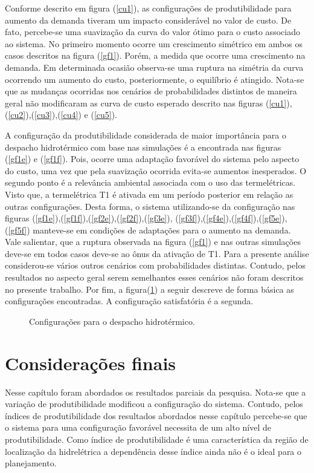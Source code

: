 Conforme descrito em figura (\ref{cu1}), as configura\c c\~oes de produtibilidade para aumento da demanda tiveram um
impacto consider\'avel no valor de custo. De fato, percebe-se uma suaviza\c c\~ao da curva do valor \'otimo para o custo
associado ao sistema. No primeiro momento ocorre um crescimento sim\'etrico em ambos os casos descritos na figura
(\ref{gf1}). Por\'em, a medida que ocorre uma crescimento na demanda. Em determinada ocasi\~ao observa-se uma ruptura na
sim\'etria da curva ocorrendo um aumento do custo, posteriormente, o equil\'ibrio \'e atingido. Nota-se que as mudan\c
cas ocorridas nos cen\'arios de probabilidades distintos de maneira geral n\~ao modificaram as curva de custo esperado
descrito nas figuras (\ref{cu1}),(\ref{cu2}),(\ref{cu3}),(\ref{cu4}) e (\ref{cu5}).

A configura\c c\~ao da
produtibilidade considerada de maior import\^ancia para o despacho hidrot\'ermico com base nas simula\c c\~oes \'e a
encontrada nas figuras
(\ref{gf1e}) e (\ref{gf1f}). Pois, ocorre uma adapta\c c\~ao favor\'avel do sistema pelo
aspecto do custo, uma vez que pela suaviza\c c\~ao ocorrida evita-se aumentos inesperados. O segundo ponto  \'e a
relev\^ancia ambiental associada com o uso das termel\'etricas. Visto que, a termel\'etrica T1 \'e ativada em um
per\'iodo posterior em rela\c c\~ao as outras configura\c c\~oes. Desta forma, o sistema utilizando-se da configura\c
c\~ao nas figuras (\ref{gf1e}),(\ref{gf1f}),(\ref{gf2e}),(\ref{gf2f}),(\ref{gf3e}),
(\ref{gf3f}),(\ref{gf4e}),(\ref{gf4f}),(\ref{gf5e}),(\ref{gf5f})
manteve-se em condi\c c\~oes de adapta\c c\~oes para o aumento na demanda. Vale salientar,
que a ruptura observada na figura (\ref{gf1}) e nas outras simula\c c\~oes deve-se em todos casos deve-se ao \^onus da ativa\c c\~ao de T1.
Para a presente
an\'alise considerou-se v\'arios outros cen\'arios com probabilidades distintas. Contudo, pelos resultados no aspecto
geral serem semelhantes esses cen\'arios n\~ao foram descritos no presente trabalho. Por fim, a figura(\ref{despacho}) a seguir descreve
de forma b\'asica as configura\c c\~oes encontradas. A configura\c c\~ao satisfat\'oria \'e a segunda.
\newpage
\begin{figure}[!h]
    \centering
    
    \caption{Configura\c c\~oes para o despacho hidrot\'ermico.}
	\label{despacho}
\end{figure}

\section{Considera\c c\~oes finais}
Nesse cap\'itulo foram abordados os resultados parciais da pesquisa. Nota-se que a varia\c c\~ao de produtibilidade
modificou a configura\c c\~ao do sistema. Contudo, pelos \'indices de produtibilidade dos resultados abordados nesse
cap\'itulo percebe-se que
o sistema para uma configura\c c\~ao favor\'avel necessita de um alto n\'ivel de produtibilidade. Como \'indice de
produtibilidade \'e uma caracter\'istica da regi\~ao de localiza\c c\~ao da hidrel\'etrica a depend\^encia desse
\'indice ainda n\~ao \'e o ideal
para o planejamento. 

